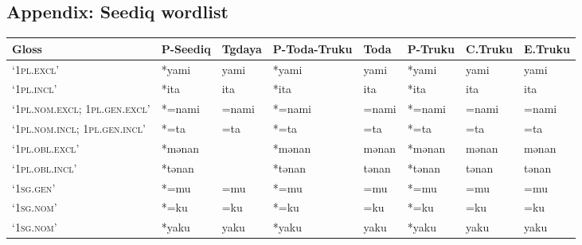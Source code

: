 \newpage
{}
\begin{landscape}
    \appendix
    \setcounter{secnumdepth}{0}
    \section{Appendix: Seediq wordlist} \label{wordlist}
    \renewcommand{\arraystretch}{1}
\begin{longtable}[c]{@{}p{3cm}<{\raggedright}p{2.75cm}<{\raggedright}p{2.75cm}<{\raggedright}p{2.75cm}<{\raggedright}p{2.75cm}<{\raggedright}p{2.75cm}<{\raggedright}p{2.75cm}<{\raggedright}p{2.75cm}<{\raggedright}@{}}
\textbf{Gloss}   & \textbf{P-Seediq}                         & \textbf{Tgdaya}  & \textbf{P-Toda-Truku}                        & \textbf{Toda}  & \textbf{P-Truku}                        & \textbf{C.Truku}            & \textbf{E.Truku}                                                          \\* \midrule
\endhead
%
\endfoot
%
\endlastfoot
%
`\textsc{1pl.excl}'                   & *yami  & yami  & *yami  & yami  & *yami  & yami  & yami  \\
`\textsc{1pl.incl}'                   & *ita   & ita   & *ita   & ita   & *ita   & ita   & ita   \\
`\textsc{1pl.nom.excl; 1pl.gen.excl}' & *=nami & =nami & *=nami & =nami & *=nami & =nami & =nami \\
`\textsc{1pl.nom.incl; 1pl.gen.incl}' & *=ta   & =ta   & *=ta   & =ta   & *=ta   & =ta   & =ta   \\
`\textsc{1pl.obl.excl}'               & *mənan &       & *mənan & mənan & *mənan & mənan & mənan \\
`\textsc{1pl.obl.incl}'               & *tənan &       & *tənan & tənan & *tənan & tənan & tənan \\
`\textsc{1sg.gen}'                                   & *=mu               & =mu                            & *=mu               & =mu                        & *=mu             & =mu                      & =mu                               \\
`\textsc{1sg.nom}'                                   & *=ku               & =ku                            & *=ku               & =ku                        & *=ku             & =ku                      & =ku                               \\
`\textsc{1sg.nom}'                                   & *yaku              & yaku                           & *yaku              & yaku                       & *yaku            & yaku                     & yaku                              \\

\end{longtable}
\end{landscape}
